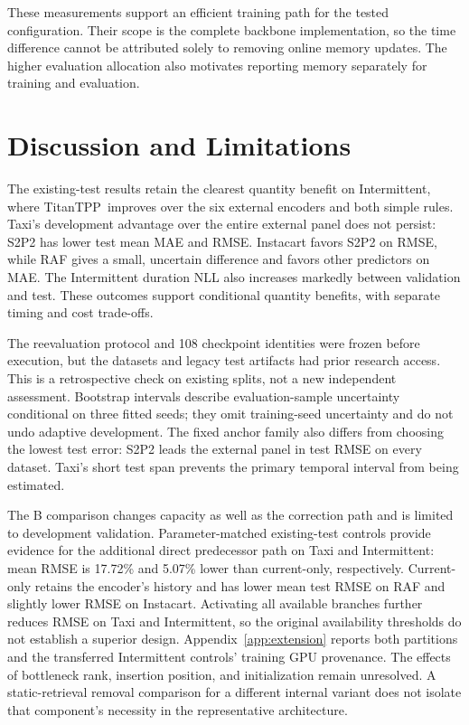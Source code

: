 \documentclass[runningheads]{llncs}
\newcommand{\method}{TitanTPP}
\begin{document}
These measurements support an efficient training path for the tested
configuration. Their scope is the complete backbone implementation, so the
time difference cannot be attributed solely to removing online memory
updates. The higher evaluation allocation also motivates reporting memory
separately for training and evaluation.

\section{Discussion and Limitations}\label{sec:limitations}
The existing-test results retain the clearest quantity benefit on
Intermittent, where \method\ improves over the six external encoders and
both simple rules. Taxi's development advantage over the entire external
panel does not persist: S2P2 has lower test mean MAE and RMSE. Instacart
favors S2P2 on RMSE, while RAF gives a small, uncertain difference and
favors other predictors on MAE. The Intermittent duration NLL also
increases markedly between validation and test. These outcomes support
conditional quantity benefits, with separate timing and cost trade-offs.

The reevaluation protocol and 108 checkpoint identities were frozen before
execution, but the datasets and legacy test artifacts had prior research
access. This is a retrospective check on existing splits, not a new
independent assessment. Bootstrap intervals describe evaluation-sample
uncertainty conditional on three fitted seeds; they omit training-seed
uncertainty and do not undo adaptive development. The fixed anchor family
also differs from choosing the lowest test error: S2P2 leads the external
panel in test RMSE on every dataset. Taxi's short test span prevents the
primary temporal interval from being estimated.

The B comparison changes capacity as well as the correction path and is
limited to development validation. Parameter-matched existing-test controls
provide evidence for the additional direct predecessor path on Taxi and
Intermittent: mean RMSE is 17.72\% and 5.07\% lower than current-only,
respectively. Current-only retains the encoder's history and has lower
mean test RMSE on RAF and slightly lower RMSE on Instacart. Activating all
available branches further reduces RMSE on Taxi and Intermittent, so the
original availability thresholds do not establish a superior design.
Appendix~\ref{app:extension} reports both partitions and the transferred
Intermittent controls' training GPU provenance. The effects of bottleneck
rank, insertion position, and initialization remain unresolved. A
static-retrieval removal comparison for a different internal variant does
not isolate that component's necessity in the representative architecture.
\end{document}
